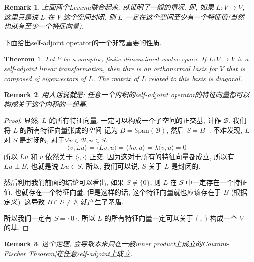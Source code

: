 \documentclass{article}
\newtheorem{theorem}{Theorem}
\newtheorem{remark}{Remark}
\def\<{\langle}
\def\>{\rangle}
\begin{document}
\begin{remark}
  上面两个Lemma联合起来, 就证明了一般的情况.
  即, 如果 $L: V\to V$, 这里只是说 $L$ 在 $V$ 这个空间封闭, 则 $L$ 一定在这个空间至少有一个特征值(当然也就有至少一个特征向量).
\end{remark}
下面给出self-adjoint operator的一个非常重要的性质.
\begin{theorem}
  Let $V$ be a complex, finite dimensional vector space.
  If $L: V\to V$ is a self-adjoint linear transformation, then thre is an orthonormal basis for $V$ that is composed of eigenvectors of $L$.
  The matrix of $L$ related to this basis is diagonal.
\end{theorem}
\begin{remark}
  用人话说就是: 任意一个内积的self-adjoint operator的特征向量都可以构成关于这个内积的一组基.
\end{remark}
\begin{proof}
  显然, $L$ 的所有特征向量, 一定可以构成一个子空间的正交基, 计作 $\mathcal{B}$.
  我们将 $L$ 的所有特征向量张成的空间 记为 $B = \mathrm{Span}(\mathcal{B})$, 然后 $S = B^\perp$.
  不难发现, $L$ 对 $S$ 是封闭的, 对于$\forall v\in \mathcal{B}, u\in S$.
  \[\<v, Lu\> = \<Lv, u\> = \<\lambda v, u\> = \lambda\<v, u\> = 0\]
  所以 $Lu$ 和 $v$ 依然关于 $\<\cdot, \cdot\>$ 正交.
  因为这对于所有的特征向量都成立, 所以有 $Lu \perp B$, 也就是说  $Lu \in S$.
  所以, 我们可以说, $S$ 关于 $L$ 是封闭的.

  然后利用我们前面的结论可以看出, 如果 $S \not=\{0\}$, 则 $L$ 在 $S$ 中一定存在一个特征值, 也就存在一个特征向量. 但是这样的话, 这个特征向量就也应该存在于 $B$ (根据定义). 这导致 $B \cap S \not = \emptyset$, 就产生了矛盾.

  所以我们一定有 $S = \{0\}$.
  所以 $L$ 的所有特征向量一定可以关于 $\<\cdot, \cdot\>$ 构成一个 $V$ 的基.
\end{proof}
\begin{remark}
  这个定理, 会导致本来只在一般inner product上成立的Courant-Fischer Theorem]在任意self-adjoint上成立.
\end{remark}
\end{document}
